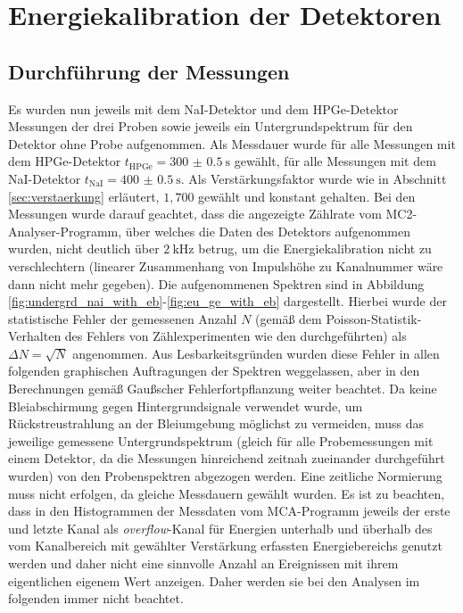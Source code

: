 \chapter{Energiekalibration der Detektoren}

\section{Durchführung der Messungen}

Es wurden nun jeweils mit dem NaI-Detektor und dem HPGe-Detektor Messungen der drei Proben sowie jeweils ein Untergrundspektrum für den Detektor ohne Probe aufgenommen. Als Messdauer wurde für alle Messungen mit dem HPGe-Detektor $t_{\text{HPGe}}=\SI{300(0.5)}{\second}$ gewählt, für alle Messungen mit dem NaI-Detektor $t_\text{NaI}=\SI{400(0.5)}{\second}$. Als Verstärkungsfaktor wurde wie in Abschnitt \ref{sec:verstaerkung} erläutert, $1,700$ gewählt und konstant gehalten. Bei den Messungen wurde darauf geachtet, dass die angezeigte Zählrate vom MC2-Analyser-Programm, über welches die Daten des Detektors aufgenommen wurden, nicht deutlich über $\SI{2}{\kilo\hertz}$ betrug, um die Energiekalibration nicht zu verschlechtern \cite[4]{521versuchsanleitung} (linearer Zusammenhang von Impulshöhe zu Kanalnummer wäre dann nicht mehr gegeben\cite[291]{leotechniques}).
Die aufgenommenen Spektren sind in Abbildung \ref{fig:undergrd_nai_with_eb}-\ref{fig:eu_ge_with_eb} dargestellt. Hierbei wurde der statistische Fehler der gemessenen Anzahl $N$ (gemäß dem Poisson-Statistik-Verhalten des Fehlers von Zählexperimenten wie den durchgeführten) als $\Delta N=\sqrt{N}$ angenommen. Aus Lesbarkeitsgründen wurden diese Fehler in allen folgenden graphischen Auftragungen der Spektren weggelassen, aber in den Berechnungen gemäß Gaußscher Fehlerfortpflanzung \cite[8-9]{gerthsen} weiter beachtet. Da keine Bleiabschirmung gegen Hintergrundsignale verwendet wurde, um Rückstreustrahlung an der Bleiumgebung möglichst zu vermeiden, muss das jeweilige gemessene Untergrundspektrum (gleich für alle Probemessungen mit einem Detektor, da die Messungen hinreichend zeitnah zueinander durchgeführt wurden) von den Probenspektren abgezogen werden. Eine zeitliche Normierung muss nicht erfolgen, da gleiche Messdauern gewählt wurden. Es ist zu beachten, dass in den Histogrammen der Messdaten vom MCA-Programm jeweils der erste und letzte Kanal als \textit{overflow}-Kanal für Energien unterhalb und überhalb des vom Kanalbereich mit gewählter Verstärkung erfassten Energiebereichs genutzt werden und daher nicht eine sinnvolle Anzahl an Ereignissen mit ihrem eigentlichen eigenem Wert anzeigen. Daher werden sie bei den Analysen im folgenden immer nicht beachtet.

